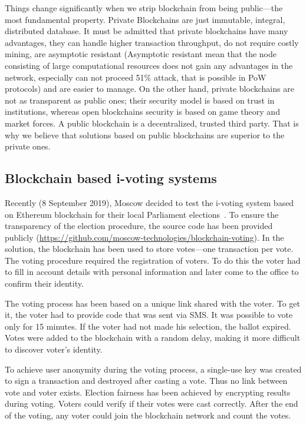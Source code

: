\documentclass[applsci,article,submit,moreauthors,pdftex]{Definitions/mdpi}
\begin{document}
Things change significantly when we strip blockchain from being public––the most fundamental property. Private Blockchains are just immutable, integral, distributed database. It must be admitted that private blockchains have many advantages, they can handle higher transaction throughput, do not require costly mining, are asymptotic resistant (Asymptotic resistant mean that the node consisting of large computational resources does not gain any advantages in the network, especially can not proceed 51\% attack, that is possible in PoW protocols) and are easier to manage. On the other hand, private blockchains are not as transparent as public ones; their security model is based on trust in institutions, whereas open blockchains security is based on game theory and market forces. A public blockchain is a decentralized, trusted third party. That is why we believe that solutions based on public blockchains are superior to the private ones.


\subsection{Blockchain based i-voting systems}
\label{related-work}
Recently (8 September 2019), Moscow decided to test the i-voting system based on Ethereum blockchain for their local Parliament elections~\cite{gaudry2019breaking}. 
To ensure the transparency of the election procedure,
the source code has been provided publicly (\url{https://github.com/moscow-technologies/blockchain-voting}).
In the solution, the blockchain has been used to store votes---one transaction per vote.
The voting procedure required the registration of voters. To do this
the voter had to fill in account details with personal information
and later come to the office to confirm their identity.

The voting process has been based on a unique link shared with the voter. To get it, the voter had to provide code that was sent via SMS. It was possible to vote only for 15 minutes. If the voter had not made his selection, the ballot expired. Votes were added to the blockchain with a random delay, making it more difficult to discover voter's identity.


To achieve user anonymity during the voting process, a single-use key was created to sign a transaction and destroyed after casting a vote. Thus no link between vote and voter exists. Election fairness has been achieved by encrypting results during voting. Voters could verify if their votes were cast correctly. After the end of the voting, any voter could join the blockchain network and count the votes.
\end{document}
